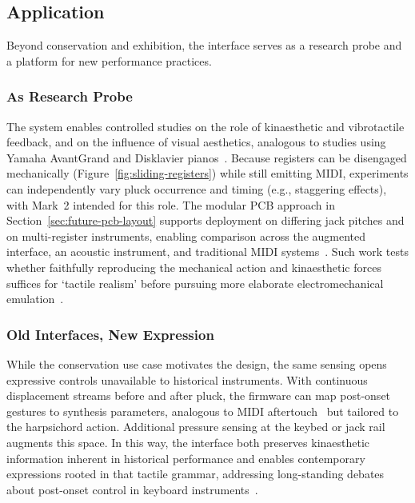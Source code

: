 \subsection{Application}

Beyond conservation and exhibition, the interface serves as a research probe and a platform for new performance practices.

\subsubsection{As Research Probe}

The system enables controlled studies on the role of kinaesthetic and vibrotactile feedback, and on the influence of visual aesthetics, analogous to studies using Yamaha AvantGrand and Disklavier pianos~\cite{fontana_perception_2018,charalampos_role_2018}. Because registers can be disengaged mechanically (Figure~\ref{fig:sliding-registers}) while still emitting MIDI, experiments can independently vary pluck occurrence and timing (e.g., staggering effects), with Mark~2 intended for this role. The modular PCB approach in Section~\ref{sec:future-pcb-layout} supports deployment on differing jack pitches and on multi-register instruments, enabling comparison across the augmented interface, an acoustic instrument, and traditional MIDI systems~\cite{mcalpine_sampling_2014}. Such work tests whether faithfully reproducing the mechanical action and kinaesthetic forces suffices for `tactile realism' before pursuing more elaborate electromechanical emulation~\cite{mcalpine_sampling_2014,gillespie_virtual_1994,lozada_novel_2007,timmermans_multibody-based_2020}.

\subsubsection{Old Interfaces, New Expression}

While the conservation use case motivates the design, the same sensing opens expressive controls unavailable to historical instruments. With continuous displacement streams before and after pluck, the firmware can map post-onset gestures to synthesis parameters, analogous to MIDI aftertouch~\cite{wiffen_prophet_1983,jungleib_complete_1983} but tailored to the harpsichord action. Additional pressure sensing at the keybed or jack rail~\cite{hamilton_two_2025} augments this space. In this way, the interface both preserves kinaesthetic information inherent in historical performance and enables contemporary expressions rooted in that tactile grammar, addressing long-standing debates about post-onset control in keyboard instruments~\cite{macritchie_using_2015,woolley_musical_2017}.

